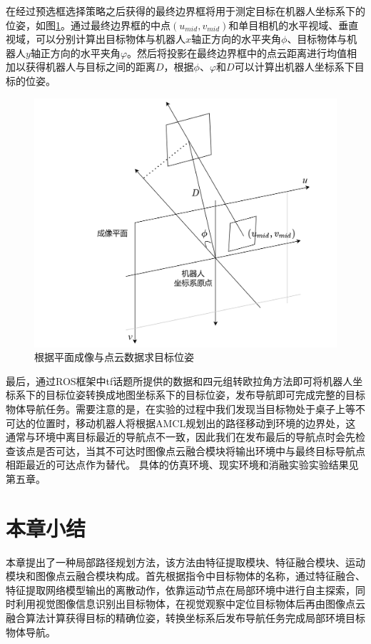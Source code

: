 在经过预选框选择策略之后获得的最终边界框将用于测定目标在机器人坐标系下的位姿，如图\ref{target_pose}。通过最终边界框的中点$\left( {{u_{mid}},{v_{mid}}} \right)$和单目相机的水平视域、垂直视域，可以分别计算出目标物体与机器人$x$轴正方向的水平夹角$\phi $、目标物体与机器人$y$轴正方向的水平夹角$\varphi $。然后将投影在最终边界框中的点云距离进行均值相加以获得机器人与目标之间的距离$D$，根据$\phi $、$\varphi $和$D$可以计算出机器人坐标系下目标的位姿。
\begin{figure}[htbp]
    \centering
    \includegraphics[scale=0.12]{Fig/目标坐标..png}
    \caption{\label{target_pose}根据平面成像与点云数据求目标位姿}
\end{figure}
最后，通过ROS框架中tf话题所提供的数据和四元组转欧拉角方法即可将机器人坐标系下的目标位姿转换成地图坐标系下的目标位姿，发布导航即可完成完整的目标物体导航任务。需要注意的是，在实验的过程中我们发现当目标物处于桌子上等不可达的位置时，移动机器人将根据AMCL规划出的路径移动到环境的边界处，这通常与环境中离目标最近的导航点不一致，因此我们在发布最后的导航点时会先检查该点是否可达，当其不可达时图像点云融合模块将输出环境中与最终目标导航点相距最近的可达点作为替代。
具体的仿真环境、现实环境和消融实验实验结果见第五章。





\section{本章小结}
本章提出了一种局部路径规划方法，该方法由特征提取模块、特征融合模块、运动模块和图像点云融合模块构成。首先根据指令中目标物体的名称，通过特征融合、特征提取网络模型输出的离散动作，依靠运动节点在局部环境中进行自主探索，同时利用视觉图像信息识别出目标物体，在视觉观察中定位目标物体后再由图像点云融合算法计算获得目标的精确位姿，转换坐标系后发布导航任务完成局部环境目标物体导航。
